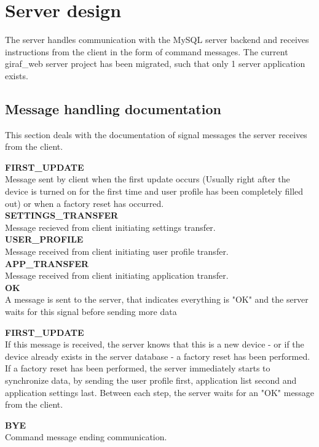 \section{Server design}
The server handles communication with the MySQL server backend and receives instructions from the client in the form of command messages. The current giraf\_web server project has been migrated, such that only 1 server application exists. 

\subsection{Message handling documentation}
This section deals with the documentation of signal messages the server receives from the client.  

\textbf{FIRST\_UPDATE}\\
Message sent by client when the first update occurs (Usually right after the device is turned on for the first time and user profile has been completely filled out) or when a factory reset has occurred.\\

\textbf{SETTINGS\_TRANSFER}\\
Message recieved from client initiating settings transfer. \\

\textbf{USER\_PROFILE}\\
Message received from client initiating user profile transfer. \\ 

\textbf{APP\_TRANSFER}\\
Message received from client initiating application transfer. \\

\textbf{OK}\\
A message is sent to the server, that indicates everything is "OK" and the server waits for this signal before sending more data

\textbf{FIRST\_UPDATE}\\
If this message is received, the server knows that this is a new device - or if the device already exists in the server database - a factory reset has been performed.
If a factory reset has been performed, the server immediately starts to synchronize data, by sending the user profile first, application list second and application settings last. Between each step, the server waits for an "OK" message from the client. 

\textbf{BYE}\\
Command message ending communication. 

